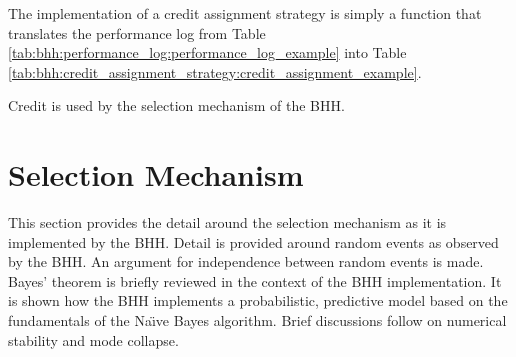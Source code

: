 The implementation of a credit assignment strategy is simply a function that translates the performance log from Table \ref{tab:bhh:performance_log:performance_log_example} into Table \ref{tab:bhh:credit_assignment_strategy:credit_assignment_example}.

\begin{table}[htbp]
      \centering
      \caption{Credit assignment strategy output table showing \textit{ibest} credit assignment for the first five entities and their selected heuristics for step 1 of the training process.}
      \label{tab:bhh:credit_assignment_strategy:credit_assignment_example}%
      \par\bigskip
\end{table}%

Credit is used by the selection mechanism of the \acs{BHH}.


\section{Selection Mechanism}\label{sec:bhh:selection_mechanism}

This section provides the detail around the selection mechanism as it is implemented by the \acs{BHH}. Detail is provided around random events as observed by the \acs{BHH}. An argument for independence between random events is made. Bayes' theorem is briefly reviewed in the context of the \acs{BHH} implementation. It is shown how the \acs{BHH} implements a probabilistic, predictive model based on the fundamentals of the Na\"{\i}ve Bayes algorithm. Brief discussions follow on numerical stability and mode collapse.

